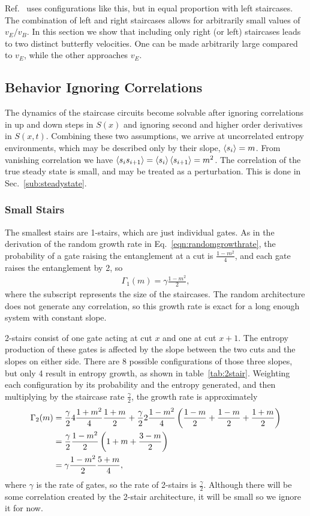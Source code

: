 Ref.~\cite{Nahum2018} uses configurations like this, but in equal proportion with left staircases. The combination of left and right staircases allows for arbitrarily small values of $v_E/v_B$. In this section we show that including only right (or left) staircases leads to two distinct butterfly velocities. One can be made arbitrarily large compared to $v_E$, while the other approaches $v_E$.

\subsection{Behavior Ignoring Correlations} \label{sub:anal}

The dynamics of the staircase circuits become solvable after ignoring correlations in up and down steps in $S(x)$ and ignoring second and higher order derivatives in $S(x,t)$. Combining these two assumptions, we arrive at uncorrelated entropy environments, which may be described only by their slope, $\left\langle s_i \right\rangle = m$. From vanishing correlation we have $\left\langle s_is_{i+1} \right\rangle = \left\langle s_i \right\rangle\left\langle s_{i+1} \right\rangle = m^2$. The correlation of the true steady state is small, and may be treated as a perturbation. This is done in Sec.~\ref{sub:steadystate}.

\subsubsection{Small Stairs} \label{subsub:smallstairs} 

The smallest stairs are 1-stairs, which are just individual gates. As in the derivation of the random growth rate in Eq.~\ref{eqn:randomgrowthrate}, the probability of a gate raising the entanglement at a cut is $\frac{1-m^2}{4}$, and each gate raises the entanglement by 2, so 
\begin{align}
\Gamma_1(m) = \gamma\frac{1-m^2}{2},
\end{align}
where the subscript represents the size of the staircases. The random architecture does not generate any correlation, so this growth rate is exact for a long enough system with constant slope.

2-stairs consist of one gate acting at cut $x$ and one at cut $x+1$. The entropy production of these gates is affected by the slope between the two cuts and the slopes on either side. There are 8 possible configurations of those three slopes, but only 4 result in entropy growth, as shown in table~\ref{tab:2stair}. Weighting each configuration by its probability and the entropy generated, and then multiplying by the staircase rate $\frac{\gamma}{2}$, the growth rate is approximately
\begin{align}
\Gamma_2(m) &= \frac{\gamma}{2} 4\frac{1+m^2}{4}\frac{1+m}{2} + \frac{\gamma}{2}
	2\frac{1-m^2}{4}
	\left(\frac{1-m}{2} + \frac{1-m}{2} + \frac{1+m}{2}\right) \nonumber\\
&= \frac{\gamma}{2}\frac{1-m^2}{2}\left(1+m + \frac{3-m}{2}\right)\nonumber\\
&= \gamma\frac{1-m^2}{2}\frac{5+m}{4}, \label{eqn:2rate}
\end{align}
where $\gamma$ is the rate of gates, so the rate of 2-stairs is $\frac{\gamma}{2}$. Although there will be some correlation created by the 2-stair architecture, it will be small so we ignore it for now. 

